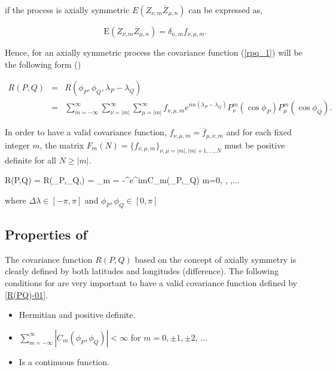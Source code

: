 		if the process is axially symmetric $E(Z_{\nu,m} \overline{Z}_{\mu,n})$ can be expressed as,
				
		\[
			\mbox{E} (Z_{\nu,m} \overline{Z}_{\mu,n}) = \delta_{n,m} f_{\nu,\mu,m}.
		\]
					
		Hence, for an axially symmetric process the covariance function (\ref{rpq_1}) will be the following form (\cite{Huang2012}) 
					
		\begin{eqnarray} \label{axially-symmetry-cov}
			R(P,Q)  & = & R(\phi_P, \phi_Q, \lambda_P-\lambda_Q) \nonumber \\
			& = & \sum_{m=-\infty}^{\infty} \sum_{\nu=|m|}^\infty \sum_{\mu=|m|}^\infty f_{\nu,\mu,m} e^{im (\lambda_P-\lambda_Q)} P_{\nu}^m(\cos \phi_P) P_{\mu}^m (\cos \phi_Q) .
		\end{eqnarray}
					
		In order to have a valid covariance function, $f_{\nu,\mu, m} = \overline{f}_{\mu, \nu, m}$ and for each fixed integer $m$, the matrix $F_m(N) = \{ f_{\nu,\mu,m} \}_{\nu,\mu=|m|,|m|+1, \ldots, N }$ must be positive definite for all $N \ge |m|$. 
				
		\beq \label{R(PQ)-01}
		R(P,Q) = R(\phi_P,\phi_Q,\Delta\lambda) = \sum_{m = -\infty}^{\infty}e^{im\Delta\lambda}C_m(\phi_P,\phi_Q) \quad m=0, , ,...
		\eeq
				
		where $\Delta\lambda \in [-\pi, \pi]$ and $\phi_P, \phi_Q \in [0,\pi]$
		\subsection{Properties of \Cm}
					
		The covariance function $R(P,Q)$ based on the concept of axially symmetry is clearly defined by both latitudes and longitudes (difference). The following conditions for \Cm are very important to have a valid covariance function defined by \ref{R(PQ)-01}.  
					
		\begin{itemize}
			\item Hermitian and positive definite.
			\item $\sum_{m = -\infty}^{\infty}|C_m(\phi_P,\phi_Q)|<\infty$ for $m=0,\pm 1, \pm  2$, ...
			\item Is a continuous function. 
		\end{itemize}
				
